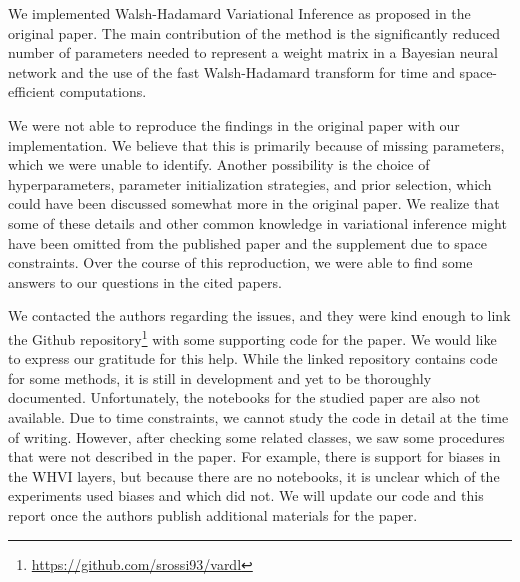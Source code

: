 We implemented Walsh-Hadamard Variational Inference as proposed in the original paper.
The main contribution of the method is the significantly reduced number of parameters needed to represent a weight matrix in a Bayesian neural network and the use of the fast Walsh-Hadamard transform for time and space-efficient computations.

We were not able to reproduce the findings in the original paper with our implementation.
We believe that this is primarily because of missing parameters, which we were unable to identify.
Another possibility is the choice of hyperparameters, parameter initialization strategies, and prior selection, which could have been discussed somewhat more in the original paper.
We realize that some of these details and other common knowledge in variational inference might have been omitted from the published paper and the supplement due to space constraints.
Over the course of this reproduction, we were able to find some answers to our questions in the cited papers.

We contacted the authors regarding the issues, and they were kind enough to link the Github repository\footnote{\url{https://github.com/srossi93/vardl}} with some supporting code for the paper.
We would like to express our gratitude for this help.
While the linked repository contains code for some methods, it is still in development and yet to be thoroughly documented.
Unfortunately, the notebooks for the studied paper are also not available.
Due to time constraints, we cannot study the code in detail at the time of writing.
However, after checking some related classes, we saw some procedures that were not described in the paper.
For example, there is support for biases in the WHVI layers, but because there are no notebooks, it is unclear which of the experiments used biases and which did not.
We will update our code and this report once the authors publish additional materials for the paper.
